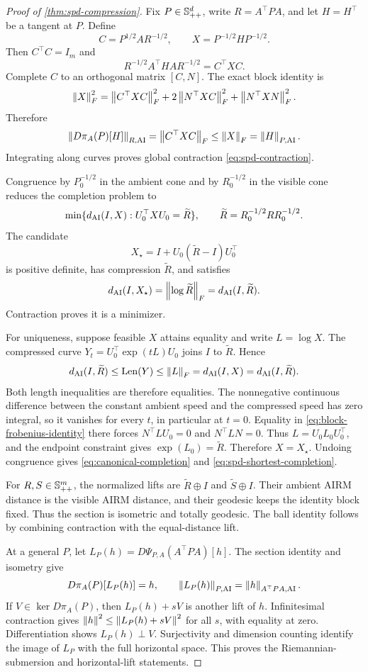 \begin{proof}[Proof of \cref{thm:spd-compression}]
Fix \(P\in\mathbb S_{++}^d\), write \(R=A^\top PA\), and let \(H=H^\top\) be a
tangent at \(P\).  Define
\[
  C=P^{1/2}AR^{-1/2},
  \qquad
  X=P^{-1/2}HP^{-1/2}.
\]
Then \(C^\top C=I_m\) and
\[
  R^{-1/2}A^\top HA R^{-1/2}=C^\top XC.
\]
Complete \(C\) to an orthogonal matrix \([C,N]\).  The exact block identity
is
\begin{equation}
  \left\lVert X\right\rVert_F^2
  =\left\lVert C^\top XC\right\rVert_F^2
  +2\left\lVert N^\top XC\right\rVert_F^2
  +\left\lVert N^\top XN\right\rVert_F^2.
  \label{eq:block-frobenius-identity}
\end{equation}
Therefore
\[
  \left\lVert D\pi_A(P)[H]\right\rVert_{R,\mathrm{AI}}
  =\left\lVert C^\top XC\right\rVert_F
  \le\left\lVert X\right\rVert_F
  =\left\lVert H\right\rVert_{P,\mathrm{AI}}.
\]
Integrating along curves proves global contraction
\eqref{eq:spd-contraction}.

Congruence by \(P_0^{-1/2}\) in the ambient cone and by \(R_0^{-1/2}\) in
the visible cone reduces the completion problem to
\[
  \min\{d_{\mathrm{AI}}(I,X):U_0^\top XU_0=\widetilde R\},
  \qquad
  \widetilde R=R_0^{-1/2}RR_0^{-1/2}.
\]
The candidate
\[
  X_\star=I+U_0(\widetilde R-I)U_0^\top
\]
is positive definite, has compression \(\widetilde R\), and satisfies
\[
  d_{\mathrm{AI}}(I,X_\star)=\left\lVert \log\widetilde R\right\rVert_F=d_{\mathrm{AI}}(I,\widetilde R).
\]
Contraction proves it is a minimizer.

For uniqueness, suppose feasible \(X\) attains equality and write
\(L=\log X\).  The compressed curve
\(Y_t=U_0^\top\exp(tL)U_0\) joins \(I\) to \(\widetilde R\).  Hence
\[
  d_{\mathrm{AI}}(I,\widetilde R)
  \le\operatorname{Len}(Y)
  \le\left\lVert L\right\rVert_F
  =d_{\mathrm{AI}}(I,X)
  =d_{\mathrm{AI}}(I,\widetilde R).
\]
Both length inequalities are therefore equalities.  The nonnegative
continuous difference between the constant ambient speed and the compressed
speed has zero integral, so it vanishes for every \(t\), in particular at
\(t=0\).  Equality in \eqref{eq:block-frobenius-identity} there forces
\(N^\top LU_0=0\) and \(N^\top LN=0\).  Thus
\(L=U_0L_0U_0^\top\), and the endpoint constraint gives
\(\exp(L_0)=\widetilde R\).  Therefore \(X=X_\star\).  Undoing congruence
gives \eqref{eq:canonical-completion} and
\eqref{eq:spd-shortest-completion}.

For \(R,S\in\mathbb S_{++}^m\), the normalized lifts are
\(\widetilde R\oplus I\) and \(\widetilde S\oplus I\).  Their ambient AIRM
distance is the visible AIRM distance, and their geodesic keeps the identity
block fixed.  Thus the section is isometric and totally geodesic.  The ball
identity follows by combining contraction with the equal-distance lift.

At a general \(P\), let
\(L_P(h)=D\Psi_{P,A}(A^\top PA)[h]\).  The section identity and isometry give
\[
  D\pi_A(P)[L_P(h)]=h,
  \qquad
  \left\lVert L_P(h)\right\rVert_{P,\mathrm{AI}}=\left\lVert h\right\rVert_{A^\top PA,\mathrm{AI}}.
\]
If \(V\in\ker D\pi_A(P)\), then \(L_P(h)+sV\) is another lift of \(h\).
Infinitesimal contraction gives
\(\left\lVert h\right\rVert^2\le\left\lVert L_P(h)+sV\right\rVert^2\) for all \(s\), with equality at zero.
Differentiation shows \(L_P(h)\perp V\).  Surjectivity and dimension counting
identify the image of \(L_P\) with the full horizontal space.  This proves
the Riemannian-submersion and horizontal-lift statements.


\end{proof}
